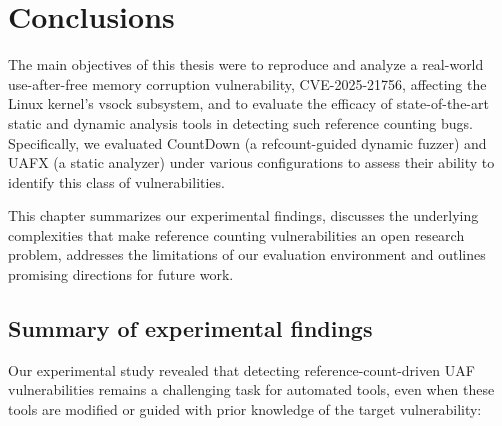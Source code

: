 \chapter{Conclusions}

The main objectives of this thesis were to reproduce and analyze a real-world use-after-free memory corruption vulnerability, CVE-2025-21756, affecting the Linux kernel's vsock subsystem, and to evaluate the efficacy of state-of-the-art static and dynamic analysis tools in detecting such reference counting bugs. Specifically, we evaluated CountDown (a refcount-guided dynamic fuzzer) and UAFX (a static analyzer) under various configurations to assess their ability to identify this class of vulnerabilities.

This chapter summarizes our experimental findings, discusses the underlying complexities that make reference counting vulnerabilities an open research problem, addresses the limitations of our evaluation environment and outlines promising directions for future work.

\section{Summary of experimental findings}

Our experimental study revealed that detecting reference-count-driven UAF vulnerabilities remains a challenging task for automated tools, even when these tools are modified or guided with prior knowledge of the target vulnerability:

